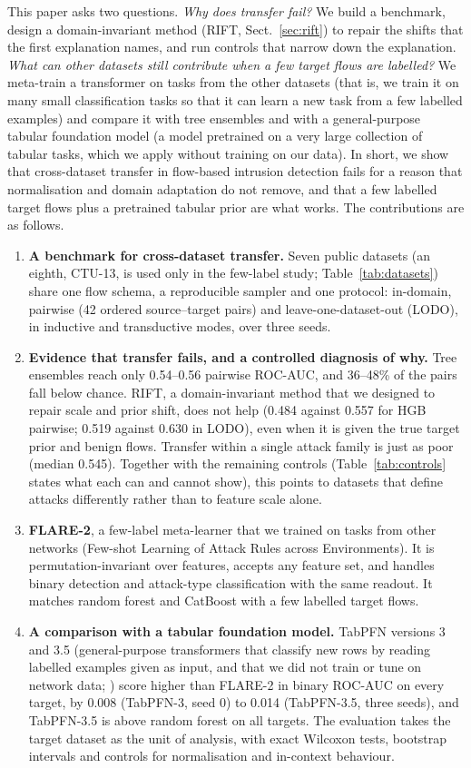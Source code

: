 \documentclass[pdflatex,sn-mathphys-num]{sn-jnl}%
\begin{document}
This paper asks two questions.
\emph{Why does transfer fail?} We build a benchmark, design a domain-invariant method (RIFT, Sect.~\ref{sec:rift}) to repair the shifts that the first explanation names, and run controls that narrow down the explanation.
\emph{What can other datasets still contribute when a few target flows are labelled?} We meta-train a transformer on tasks from the other datasets (that is, we train it on many small classification tasks so that it can learn a new task from a few labelled examples) and compare it with tree ensembles and with a general-purpose tabular foundation model (a model pretrained on a very large collection of tabular tasks, which we apply without training on our data).
In short, we show that cross-dataset transfer in flow-based intrusion detection fails for a reason that normalisation and domain adaptation do not remove, and that a few labelled target flows plus a pretrained tabular prior are what works.
The contributions are as follows.
\begin{enumerate}
\item \textbf{A benchmark for cross-dataset transfer.} Seven public datasets (an eighth, CTU-13, is used only in the few-label study; Table~\ref{tab:datasets}) share one flow schema, a reproducible sampler and one protocol: in-domain, pairwise (42 ordered source--target pairs) and leave-one-dataset-out (LODO), in inductive and transductive modes, over three seeds.
\item \textbf{Evidence that transfer fails, and a controlled diagnosis of why.} Tree ensembles reach only 0.54--0.56 pairwise ROC-AUC, and 36--48\% of the pairs fall below chance. RIFT, a domain-invariant method that we designed to repair scale and prior shift, does not help (0.484 against 0.557 for HGB pairwise; 0.519 against 0.630 in LODO), even when it is given the true target prior and benign flows. Transfer within a single attack family is just as poor (median 0.545). Together with the remaining controls (Table~\ref{tab:controls} states what each can and cannot show), this points to datasets that define attacks differently rather than to feature scale alone.
\item \textbf{FLARE-2}, a few-label meta-learner that we trained on tasks from other networks (Few-shot Learning of Attack Rules across Environments). It is permutation-invariant over features, accepts any feature set, and handles binary detection and attack-type classification with the same readout. It matches random forest and CatBoost with a few labelled target flows.
\item \textbf{A comparison with a tabular foundation model.} TabPFN versions 3 and 3.5 (general-purpose transformers that classify new rows by reading labelled examples given as input, and that we did not train or tune on network data; \citealt{priorlabs2026tabpfn3}) score higher than FLARE-2 in binary ROC-AUC on every target, by 0.008 (TabPFN-3, seed 0) to 0.014 (TabPFN-3.5, three seeds), and TabPFN-3.5 is above random forest on all targets. The evaluation takes the target dataset as the unit of analysis, with exact Wilcoxon tests, bootstrap intervals and controls for normalisation and in-context behaviour.
\end{enumerate}
\end{document}
